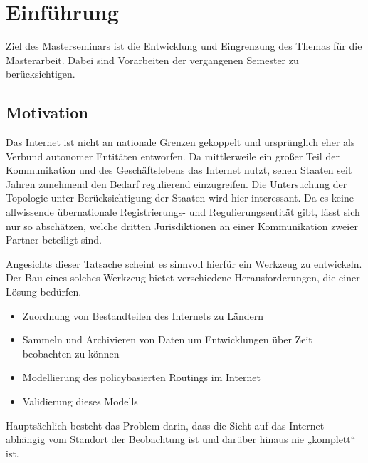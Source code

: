 \newpage

\section{Einführung}

Ziel des Masterseminars ist die Entwicklung und Eingrenzung des Themas für die Masterarbeit.
Dabei sind Vorarbeiten der vergangenen Semester zu berücksichtigen.

\subsection{Motivation}
Das Internet ist nicht an nationale Grenzen gekoppelt und ursprünglich eher als Verbund autonomer Entitäten entworfen.
Da mittlerweile ein großer Teil der Kommunikation und des Geschäftslebens das Internet nutzt, sehen Staaten seit Jahren zunehmend den Bedarf regulierend einzugreifen.
Die Untersuchung der Topologie unter Berücksichtigung der Staaten wird hier interessant.
Da es keine allwissende übernationale Registrierungs- und Regulierungsentität gibt, lässt sich nur so abschätzen, welche dritten Jurisdiktionen an einer Kommunikation zweier Partner beteiligt sind.

Angesichts dieser Tatsache scheint es sinnvoll hierfür ein Werkzeug zu entwickeln.
Der Bau eines solches Werkzeug bietet verschiedene Herausforderungen, die einer Lösung bedürfen.
\begin{itemize}
  \item Zuordnung von Bestandteilen des Internets zu Ländern
  \item Sammeln und Archivieren von Daten um Entwicklungen über Zeit beobachten zu können
  \item Modellierung des policybasierten Routings im Internet
  \item Validierung dieses Modells
\end{itemize}
Hauptsächlich besteht das Problem darin, dass die Sicht auf das Internet abhängig vom Standort der Beobachtung ist und darüber hinaus nie „komplett“ ist.

